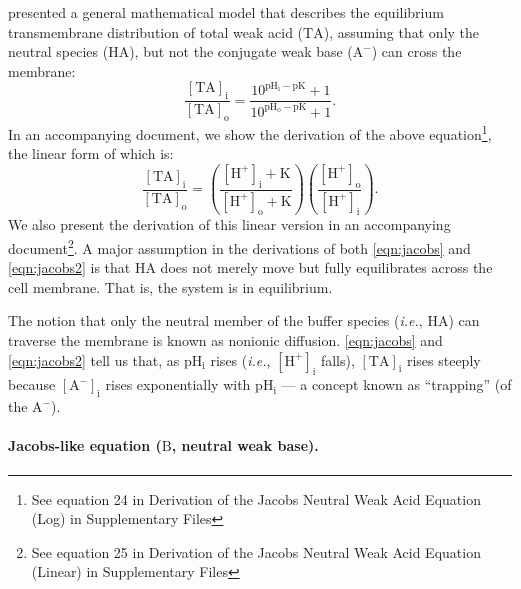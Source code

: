 \documentclass[fleqn,10pt]{physiome}
\begin{document}
\cite{jacobs1940some} presented a general mathematical model that describes the equilibrium transmembrane distribution of total weak acid ($\mathrm{TA}$), assuming that only the neutral species ($\mathrm{HA}$), but not the conjugate weak base ($\mathrm{A^-}$) can cross the membrane:
\begin{equation}
\dfrac{\mathrm{[TA]_i}}{\mathrm{[TA]_o}}=\dfrac{10^{\mathrm{pH_i}-\mathrm{pK}}+1}{10^{\mathrm{pH_o}-\mathrm{pK}}+1}.
\label{eqn:jacobs}
\end{equation}
In an accompanying document, we show the derivation of the above equation\footnote{See equation 24 in Derivation of the Jacobs Neutral Weak Acid Equation (Log) in Supplementary Files}, the linear form of which is:
\begin{equation}
\dfrac{\mathrm{[TA]_i}}{\mathrm{[TA]_o}}=\left(\dfrac{\mathrm{[H^+]_i}+\mathrm{K}}{\mathrm{[H^+]_o}+\mathrm{K}}\right)\left( \dfrac{\mathrm{[H^+]_o}}{\mathrm{[H^+]_i}}\right).
\label{eqn:jacobs2}
\end{equation}
We also present the derivation of this linear version in an accompanying document\footnote{See equation 25 in Derivation of the Jacobs Neutral Weak Acid Equation (Linear) in Supplementary Files}. A major assumption in the derivations of both \autoref{eqn:jacobs} and \autoref{eqn:jacobs2} is that $\mathrm{HA}$ does not merely move but fully equilibrates across the cell membrane. That is, the system is in equilibrium.

The notion that only the neutral member of the buffer species (\emph{i.e.}, $\mathrm{HA}$) can traverse the membrane is known as nonionic diffusion. \autoref{eqn:jacobs} and \autoref{eqn:jacobs2} tell us that, as $\mathrm{pH_i}$ rises (\emph{i.e.}, $\mathrm{[H^+]_i}$ falls), $\mathrm{[TA]_i}$ rises steeply because $\mathrm{[A^-]_i}$ rises exponentially with $\mathrm{pH_i}$ --- a concept known as ``trapping'' (of the $\mathrm{A^-}$).

\paragraph{Jacobs-like equation ($\mathrm{B}$, neutral weak base).}
\end{document}
